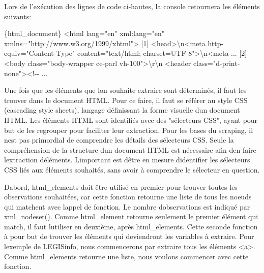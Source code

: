 \documentclass[
  letterpaper,
  DIV=11,
  numbers=noendperiod]{scrreprt}
\newenvironment{Shaded}{\begin{snugshade}}{\end{snugshade}}
\newcommand{\DataTypeTok}[1]{\textcolor[rgb]{0.68,0.00,0.00}{#1}}
\newcommand{\ExtensionTok}[1]{\textcolor[rgb]{0.00,0.23,0.31}{#1}}
\newcommand{\NormalTok}[1]{\textcolor[rgb]{0.00,0.23,0.31}{#1}}
\newcommand{\OperatorTok}[1]{\textcolor[rgb]{0.37,0.37,0.37}{#1}}
\newcommand{\StringTok}[1]{\textcolor[rgb]{0.13,0.47,0.30}{#1}}
\newcommand{\VariableTok}[1]{\textcolor[rgb]{0.07,0.07,0.07}{#1}}
\begin{document}
Lors de l'exécution des lignes de code ci-hautes, la console retournera
les éléments suivants:

\begin{Shaded}
\begin{Highlighting}[]
\ExtensionTok{\{html\_document\}}
\OperatorTok{\textless{}}\NormalTok{html }\VariableTok{lang}\OperatorTok{=}\StringTok{"en"} \ExtensionTok{xml:lang=}\StringTok{"en"}\NormalTok{ xmlns=}\StringTok{"http://www.w3.org/1999/xhtml"}\OperatorTok{\textgreater{}}
\ExtensionTok{[1]} \OperatorTok{\textless{}}\NormalTok{head}\OperatorTok{\textgreater{}}\DataTypeTok{\textbackslash{}n}\OperatorTok{\textless{}}\NormalTok{meta http{-}equiv=}\StringTok{"Content{-}Type"}\NormalTok{ content=}\StringTok{"text/html;         charset=UTF{-}8"}\OperatorTok{\textgreater{}}\DataTypeTok{\textbackslash{}n}\OperatorTok{\textless{}}\NormalTok{meta  ...}
\ExtensionTok{[2]} \OperatorTok{\textless{}}\NormalTok{body class=}\StringTok{"body{-}wrapper ce{-}parl vh{-}100"}\OperatorTok{\textgreater{}}\DataTypeTok{\textbackslash{}r\textbackslash{}n}    \OperatorTok{\textless{}}\NormalTok{header class=}\StringTok{"d{-}print{-}none"}\OperatorTok{\textgreater{}\textless{}}\NormalTok{!{-}{-} ...}
\end{Highlighting}
\end{Shaded}

Une fois que les éléments que l\textquotesingle on souhaite extraire
sont déterminés, il faut les trouver dans le document HTML. Pour ce
faire, il faut se référer au style CSS (cascading style sheets), langage
définissant la forme visuelle d\textquotesingle un document HTML. Les
éléments HTML sont identifiés avec des "sélecteurs CSS", ayant pour but
de les regrouper pour faciliter leur extraction. Pour les bases du
scraping, il n\textquotesingle est pas primordial de comprendre les
détails des sélecteurs CSS. Seule la compréhension de la structure
d\textquotesingle un document HTML est nécessaire afin
d\textquotesingle en faire l\textquotesingle extraction
d\textquotesingle éléments. L\textquotesingle important est
d\textquotesingle être en mesure d\textquotesingle identifier les
sélecteurs CSS liés aux éléments souhaités, sans avoir à comprendre le
sélecteur en question.

D\textquotesingle abord, html\_elements doit être utilisé en premier
pour trouver toutes les observations souhaitées, car cette fonction
retourne une liste de tous les noeuds qui matchent avec
l\textquotesingle appel de fonction. Le nombre
d\textquotesingle observations est indiqué par xml\_nodeset(). Comme
html\_element retourne seulement le premier élément qui match, il faut
l\textquotesingle utiliser en deuxième, après html\_elements. Cette
seconde fonction à pour but de trouver les éléments qui deviendront les
variables à extraire. Pour l\textquotesingle exemple de LEGISinfo, nous
commencerons par extraire tous les éléments \textless a\textgreater.
Comme html\_elements retourne une liste, nous voulons commencer avec
cette fonction.~
\end{document}
